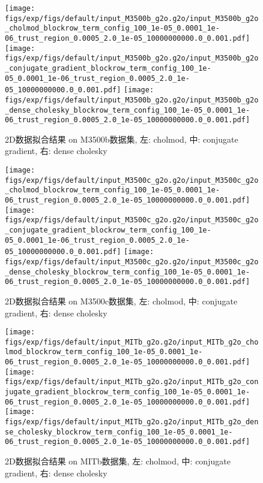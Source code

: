 \documentclass{ctexart}
\begin{document}
\begin{figure}[!htbp]
	\centering
	\texttt{[image: figs/exp/figs/default/input\_M3500b\_g2o.g2o/input\_M3500b\_g2o\_cholmod\_blockrow\_term\_config\_100\_1e-05\_0.0001\_1e-06\_trust\_region\_0.0005\_2.0\_1e-05\_10000000000.0\_0.001.pdf]}
	\texttt{[image: figs/exp/figs/default/input\_M3500b\_g2o.g2o/input\_M3500b\_g2o\_conjugate\_gradient\_blockrow\_term\_config\_100\_1e-05\_0.0001\_1e-06\_trust\_region\_0.0005\_2.0\_1e-05\_10000000000.0\_0.001.pdf]}
	\texttt{[image: figs/exp/figs/default/input\_M3500b\_g2o.g2o/input\_M3500b\_g2o\_dense\_cholesky\_blockrow\_term\_config\_100\_1e-05\_0.0001\_1e-06\_trust\_region\_0.0005\_2.0\_1e-05\_10000000000.0\_0.001.pdf]}
	\caption{2D数据拟合结果 on M3500b数据集, 左: cholmod, 中: conjugate gradient, 右: dense cholesky}\label{exp_m3500b}
\end{figure}

\begin{figure}[!htbp]
	\centering
	\texttt{[image: figs/exp/figs/default/input\_M3500c\_g2o.g2o/input\_M3500c\_g2o\_cholmod\_blockrow\_term\_config\_100\_1e-05\_0.0001\_1e-06\_trust\_region\_0.0005\_2.0\_1e-05\_10000000000.0\_0.001.pdf]}
	\texttt{[image: figs/exp/figs/default/input\_M3500c\_g2o.g2o/input\_M3500c\_g2o\_conjugate\_gradient\_blockrow\_term\_config\_100\_1e-05\_0.0001\_1e-06\_trust\_region\_0.0005\_2.0\_1e-05\_10000000000.0\_0.001.pdf]}
	\texttt{[image: figs/exp/figs/default/input\_M3500c\_g2o.g2o/input\_M3500c\_g2o\_dense\_cholesky\_blockrow\_term\_config\_100\_1e-05\_0.0001\_1e-06\_trust\_region\_0.0005\_2.0\_1e-05\_10000000000.0\_0.001.pdf]}
	\caption{2D数据拟合结果 on M3500c数据集, 左: cholmod, 中: conjugate gradient, 右: dense cholesky}\label{exp_m3500c}
\end{figure}

\begin{figure}[!htbp]
	\centering
	\texttt{[image: figs/exp/figs/default/input\_MITb\_g2o.g2o/input\_MITb\_g2o\_cholmod\_blockrow\_term\_config\_100\_1e-05\_0.0001\_1e-06\_trust\_region\_0.0005\_2.0\_1e-05\_10000000000.0\_0.001.pdf]}
	\texttt{[image: figs/exp/figs/default/input\_MITb\_g2o.g2o/input\_MITb\_g2o\_conjugate\_gradient\_blockrow\_term\_config\_100\_1e-05\_0.0001\_1e-06\_trust\_region\_0.0005\_2.0\_1e-05\_10000000000.0\_0.001.pdf]}
	\texttt{[image: figs/exp/figs/default/input\_MITb\_g2o.g2o/input\_MITb\_g2o\_dense\_cholesky\_blockrow\_term\_config\_100\_1e-05\_0.0001\_1e-06\_trust\_region\_0.0005\_2.0\_1e-05\_10000000000.0\_0.001.pdf]}
	\caption{2D数据拟合结果 on MITb数据集, 左: cholmod, 中: conjugate gradient, 右: dense cholesky}\label{exp_mitb}
\end{figure}
\end{document}
